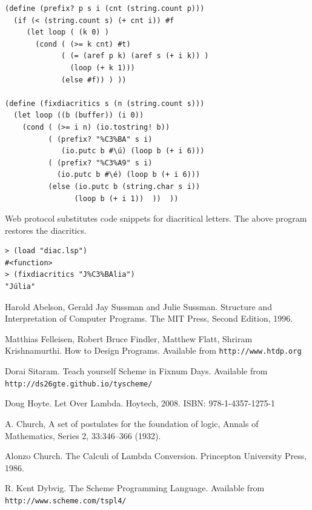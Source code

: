 \documentclass[a4paper,12pt]{book}
\begin{document}
\begin{verbatim}
(define (prefix? p s i (cnt (string.count p)))
  (if (< (string.count s) (+ cnt i)) #f 
     (let loop ( (k 0) )
       (cond ( (>= k cnt) #t)
             ( (= (aref p k) (aref s (+ i k)) )
               (loop (+ k 1)))
             (else #f)) ) ))
            
(define (fixdiacritics s (n (string.count s)))
  (let loop ((b (buffer)) (i 0))
    (cond ( (>= i n) (io.tostring! b))
          ( (prefix? "%C3%BA" s i)
             (io.putc b #\ú) (loop b (+ i 6)))
          ( (prefix? "%C3%A9" s i)
            (io.putc b #\é) (loop b (+ i 6)))
          (else (io.putc b (string.char s i))
                (loop b (+ i 1))  ))  ))
\end{verbatim}
Web protocol substitutes code snippets for
diacritical letters. The above program
restores the diacritics.

\begin{verbatim}
> (load "diac.lsp")
#<function>
> (fixdiacritics "J%C3%BAlia")
"Júlia"
\end{verbatim}
\begin{thebibliography}{99}


 Harold Abelson, Gerald Jay Sussman and
Julie Sussman. Structure and Interpretation of
Computer Programs. The MIT Press, Second Edition, 1996.

 Matthias Felleisen,
Robert Bruce Findler, Matthew Flatt, Shriram Krishnamurthi.
How to Design Programs.
Available from \verb|http://www.htdp.org|

 Dorai Sitaram. Teach yourself Scheme
in Fixnum Days. Available
from \verb|http://ds26gte.github.io/tyscheme/|

 Doug Hoyte. Let Over Lambda. Hoytech, 2008. ISBN: 978-1-4357-1275-1

 A. Church, A set of postulates for the foundation of logic, Annals of Mathematics, Series 2, 33:346–366 (1932).

 Alonzo Church. The Calculi of Lambda Conversion. Princepton University Press, 1986.

 R. Kent Dybvig. The Scheme Programming Language.
Available from \verb|http://www.scheme.com/tspl4/|

\end{thebibliography}

\printindex
\end{document}
